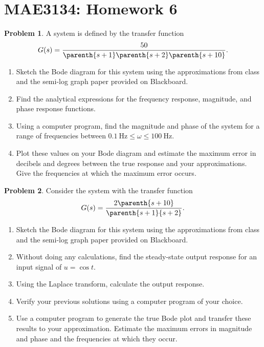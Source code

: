 \documentclass[10pt]{article}
\date{}
\theoremstyle{definition}
\newtheorem{prob}{Problem}[section]
\newenvironment{subprob}%
{\renewcommand{\theenumi}{\alph{enumi}}\renewcommand{\labelenumi}{(\theenumi)}\begin{enumerate}}%
{\end{enumerate}}%
\begin{document}
\pagestyle{empty}
\section*{MAE3134: Homework 6}
\vspace*{-0.4cm}

\begin{prob}
    A system is defined by the transfer function
    \begin{align*}
        G(s) = \frac{50}{\parenth{s+1}\parenth{s+2}\parenth{s+10}} .
    \end{align*}

    \begin{subprob}
        \item Sketch the Bode diagram for this system using the approximations from class and the semi-log graph paper provided on Blackboard.
        \item Find the analytical expressions for the frequency response, magnitude, and phase response functions.
        \item Using a computer program, find the magnitude and phase of the system for a range of frequencies between \( \SI{0.1}{\hertz} \leq \omega \leq \SI{100}{\hertz}\).
        \item Plot these values on your Bode diagram and  estimate the maximum error in decibels and degrees between the true response and your approximations.
            Give the frequencies at which the maximum error occurs.
    \end{subprob}
\end{prob}

\begin{prob}
   Consider the system with the transfer function
   \begin{align*}
        G(s) = \frac{2 \parenth{s + 10}}{\parenth{s+1}{s+2}}.
   \end{align*}
   \begin{subprob}
        \item Sketch the Bode diagram for this system using the approximations from class and the semi-log graph paper provided on Blackboard.
        \item Without doing any calculations, find the steady-state output response for an input signal of \( u = \cos t \).
        \item Using the Laplace transform, calculate the output response.
        \item Verify your previous solutions using a computer program of your choice.
        \item Use a computer program to generate the true Bode plot and transfer these results to your approximation.
            Estimate the maximum errors in magnitude and phase and the frequencies at which they occur.
   \end{subprob}
\end{prob}
\end{document}
